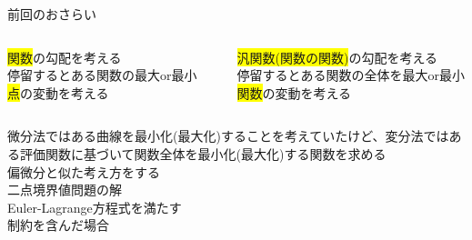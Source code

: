 \documentclass[dvipdfmx,12pt]{beamer}
\begin{document}
    \begin{frame}{前回のおさらい}
        \scriptsize
        

        \begin{columns}
            \begin{column}{.4\textwidth}
                \begin{tcolorbox}[title=微分法]
                    \colorbox{yellow}{関数}の勾配を考える\\
                    停留するとある関数の最大or最小 \\
                    \colorbox{yellow}{点}の変動を考える\\
                \end{tcolorbox}
            \end{column}
            \begin{column}{.2\textwidth}
            \end{column}
            \begin{column}{.4\textwidth}
                \begin{tcolorbox}[title=変分法]
                    \colorbox{yellow}{汎関数(関数の関数)}の勾配を考える\\
                    停留するとある関数の全体を最大or最小\\ 
                    \colorbox{yellow}{関数}の変動を考える\\
                \end{tcolorbox}
            \end{column}
        \end{columns}

        微分法ではある曲線を最小化(最大化)することを考えていたけど、変分法ではある評価関数に基づいて関数全体を最小化(最大化)する関数を求める \\
        
        偏微分と似た考え方をする \\

        二点境界値問題の解 \\
        Euler-Lagrange方程式を満たす \\
        制約を含んだ場合 \\
    \end{frame}
\end{document}
